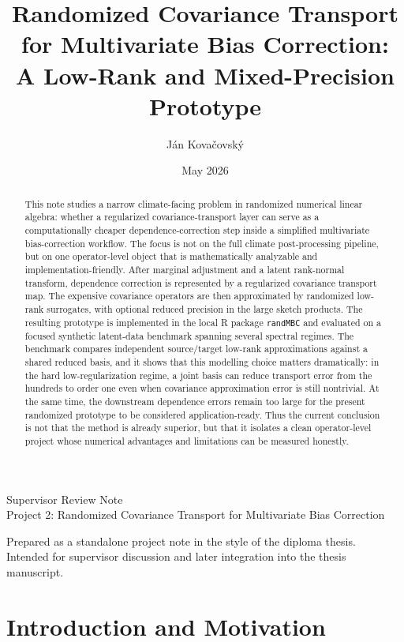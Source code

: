 \documentclass[12pt,a4paper]{article}
\title{Randomized Covariance Transport for Multivariate Bias Correction:\\A Low-Rank and Mixed-Precision Prototype}
\author{J\'an Kova\v{c}ovsk\'y}
\date{May 2026}
\newcommand{\PaperSubtitle}{Supervisor Review Note \\
Project 2: Randomized Covariance Transport for Multivariate Bias Correction}
\begin{document}
\maketitle

\begin{center}
	\large \PaperSubtitle

	\vspace{0.6em}
	\normalsize Prepared as a standalone project note in the style of the diploma thesis.\\
	Intended for supervisor discussion and later integration into the thesis manuscript.
\end{center}

\vspace{1em}

\begin{abstract}
	This note studies a narrow climate-facing problem in randomized numerical linear algebra: whether a regularized covariance-transport layer can serve as a computationally cheaper dependence-correction step inside a simplified multivariate bias-correction workflow. The focus is not on the full climate post-processing pipeline, but on one operator-level object that is mathematically analyzable and implementation-friendly. After marginal adjustment and a latent rank-normal transform, dependence correction is represented by a regularized covariance transport map. The expensive covariance operators are then approximated by randomized low-rank surrogates, with optional reduced precision in the large sketch products. The resulting prototype is implemented in the local R package \texttt{randMBC} and evaluated on a focused synthetic latent-data benchmark spanning several spectral regimes. The benchmark compares independent source/target low-rank approximations against a shared reduced basis, and it shows that this modelling choice matters dramatically: in the hard low-regularization regime, a joint basis can reduce transport error from the hundreds to order one even when covariance approximation error is still nontrivial. At the same time, the downstream dependence errors remain too large for the present randomized prototype to be considered application-ready. Thus the current conclusion is not that the method is already superior, but that it isolates a clean operator-level project whose numerical advantages and limitations can be measured honestly.
\end{abstract}

\section{Introduction and Motivation}
\end{document}

